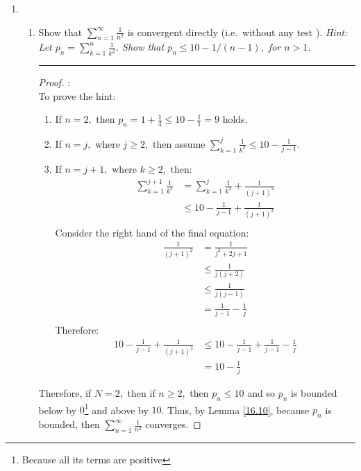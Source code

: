 \documentclass[openany, amssymb, psamsfonts]{amsart}
\theoremstyle{definition}
\numberwithin{equation}{section}
\begin{document}
\begin{enumerate}


\item 
\begin{enumerate}
\item
Show that $\displaystyle \sum_{n=1}^\infty \frac{1}{n^2}$ is convergent directly (i.e.~without any test ).  {\em Hint: Let $\displaystyle p_n = \sum_{k=1}^n \frac{1}{k^2}$.  Show that $p_n \leq 10 - 1/(n-1),$ for $n > 1$.}
\vspace{4pt}     \hrule   \vspace{4pt}\begin{proof}:\\
    To prove the hint:
    \begin{enumerate}
        \item If $n = 2,$ then $p_n = 1 + \frac{1}{4} \leq 10 - \frac{1}{1} = 9$ holds.
        \item If $n =j,$ where $j\geq 2,$ then assume $\displaystyle\sum_{k=1}^j\frac{1}{k^2} \leq 10 - \frac{1}{j-1}.$
        \item If $n = j+1,$ where $k\geq 2,$ then:
        \begin{align*}
            \displaystyle\sum_{k=1}^{j+1}\frac{1}{k^2} &= \displaystyle\sum_{k=1}^{j}\frac{1}{k^2} + \frac{1}{(j+1)^2}\\
            &\leq 10 - \frac{1}{j-1} + \frac{1}{(j+1)^2}\\
        \end{align*}
        Consider the right hand of the final equation:
        \begin{align*}
            \frac{1}{(j+1)^2} &= \frac{1}{j^2 + 2j + 1}\\
            &\leq \frac{1}{j(j+2)}\\
            &\leq \frac{1}{j(j-1)}\\
            &= \frac{1}{j-1} - \frac{1}{j}\\
        \end{align*}
        Therefore:
        \begin{align*}
            10 - \frac{1}{j-1} + \frac{1}{(j+1)^2}& \leq 10 - \frac{1}{j-1} + \frac{1}{j-1} - \frac{1}{j}\\
            &= 10 - \frac{1}{j}
        \end{align*}
    \end{enumerate}
    Therefore, if $N = 2,$ then if $n\geq 2,$ then $p_n \leq 10$ and so $p_n$ is bounded below by $0$\footnote{Because all its terms are positive} and above by $10.$ Thus, by Lemma \ref{16.10}, because $p_n$ is bounded, then $\displaystyle\sum_{n=1}^\infty\frac{1}{n^2}$ converges. 

\end{proof}
\end{enumerate}
\end{enumerate}
\end{document}
